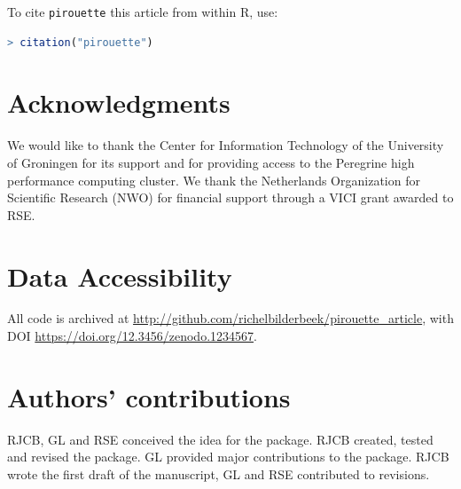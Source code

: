 To cite \verb;pirouette; this article from within R, use:

\begin{lstlisting}[language=R]
> citation("pirouette")
\end{lstlisting}

\section{Acknowledgments}

We would like to thank the Center for Information Technology of the University 
of Groningen for its support and for providing access to the Peregrine 
high performance computing cluster. 
We thank the Netherlands 
Organization for Scientific Research (NWO) for financial support 
through a VICI grant awarded to RSE.

\section{Data Accessibility}

All code is archived at 
\url{http://github.com/richelbilderbeek/pirouette_article},
with DOI \url{https://doi.org/12.3456/zenodo.1234567}.

\section{Authors' contributions}

RJCB, GL and RSE conceived the idea for the package. 
RJCB created, tested and revised the package.
GL provided major contributions to the package.
RJCB wrote the first draft of the manuscript, 
GL and RSE contributed to revisions.




